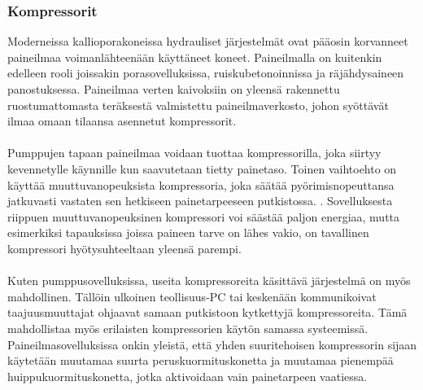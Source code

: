 \documentclass[finnish,12pt,a4paper,pdftex,elec,utf8]{aaltothesis}
\begin{document}
\subsubsection{Kompressorit}
Moderneissa kallioporakoneissa hydrauliset järjestelmät ovat pääosin korvanneet paineilmaa voimanlähteenään käyttäneet koneet\cite[s. 143]{Hakapää}. Paineilmalla on kuitenkin edelleen rooli joissakin porasovelluksissa, ruiskubetonoinnissa ja räjähdysaineen panostuksessa. Paineilmaa verten kaivoksiin on yleensä rakennettu ruostumattomasta teräksestä valmistettu paineilmaverkosto, johon syöttävät ilmaa omaan tilaansa asennetut kompressorit\cite[s. 269]{Hakapää}.
\\\\
Pumppujen tapaan paineilmaa voidaan tuottaa kompressorilla, joka siirtyy kevennetylle käynnille kun saavutetaan tietty painetaso. Toinen vaihtoehto on käyttää muuttuvanopeuksista kompressoria, joka säätää pyörimisnopeuttansa jatkuvasti vastaten sen hetkiseen painetarpeeseen putkistossa. \cite[s. 269]{Hakapää}. Sovelluksesta riippuen muuttuvanopeuksinen kompressori voi säästää paljon energiaa, mutta esimerkiksi tapauksissa joissa paineen tarve on lähes vakio, on tavallinen kompressori hyötysuhteeltaan yleensä parempi.
\\\\
Kuten pumppusovelluksissa, useita kompressoreita käsittävä järjestelmä on myös mahdollinen. Tällöin ulkoinen teollisuus-PC tai keskenään kommunikoivat taajuusmuuttajat ohjaavat samaan putkistoon kytkettyjä kompressoreita. Tämä mahdollistaa myös erilaisten kompressorien käytön samassa systeemissä. Paineilmasovelluksissa onkin yleistä, että yhden suuritehoisen kompressorin sijaan käytetään muutamaa suurta peruskuormituskonetta ja muutamaa pienempää huippukuormituskonetta, jotka aktivoidaan vain painetarpeen vaatiessa.
\clearpage
\end{document}
